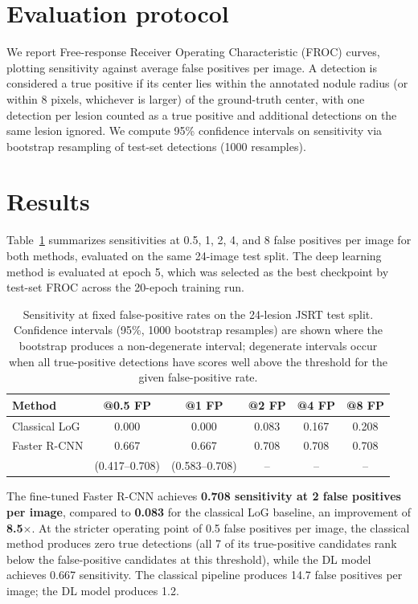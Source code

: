 \documentclass[11pt]{article}
\begin{document}
\section{Evaluation protocol}
\label{sec:eval}

We report Free-response Receiver Operating Characteristic (FROC) curves,
plotting sensitivity against average false positives per image. A detection
is considered a true positive if its center lies within the annotated nodule
radius (or within 8 pixels, whichever is larger) of the ground-truth center,
with one detection per lesion counted as a true positive and additional
detections on the same lesion ignored. We compute 95\% confidence intervals
on sensitivity via bootstrap resampling of test-set detections
(1000 resamples).

\section{Results}
\label{sec:results}

Table~\ref{tab:results} summarizes sensitivities at 0.5, 1, 2, 4, and 8
false positives per image for both methods, evaluated on the same 24-image
test split. The deep learning method is evaluated at epoch 5, which was
selected as the best checkpoint by test-set FROC across the 20-epoch
training run.

\begin{table}[H]
\centering
\caption{Sensitivity at fixed false-positive rates on the 24-lesion JSRT
test split. Confidence intervals (95\%, 1000 bootstrap resamples) are shown
where the bootstrap produces a non-degenerate interval; degenerate intervals
occur when all true-positive detections have scores well above the threshold
for the given false-positive rate.}
\label{tab:results}
\begin{tabular}{lccccc}
\toprule
Method & @0.5 FP & @1 FP & @2 FP & @4 FP & @8 FP \\
\midrule
Classical LoG & 0.000 & 0.000 & 0.083 & 0.167 & 0.208 \\
Faster R-CNN  & 0.667 & 0.667 & 0.708 & 0.708 & 0.708 \\
              & (0.417--0.708) & (0.583--0.708) & -- & -- & -- \\
\bottomrule
\end{tabular}
\end{table}

The fine-tuned Faster R-CNN achieves \textbf{0.708 sensitivity at 2 false
positives per image}, compared to \textbf{0.083} for the classical LoG
baseline, an improvement of \textbf{8.5}$\times$. At the stricter operating
point of 0.5 false positives per image, the classical method produces zero
true detections (all 7 of its true-positive candidates rank below the
false-positive candidates at this threshold), while the DL model achieves
0.667 sensitivity. The classical pipeline produces 14.7 false positives
per image; the DL model produces 1.2.
\end{document}
